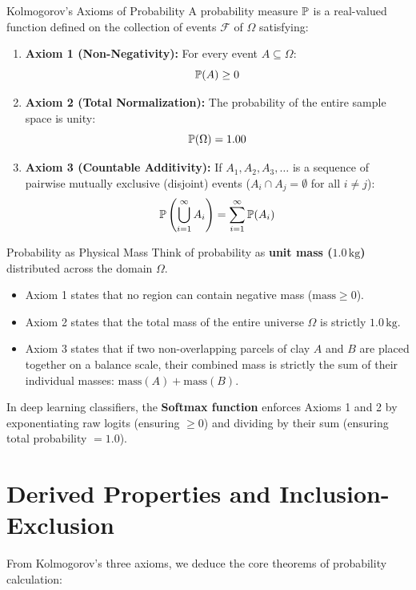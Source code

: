\begin{formulabox}{Kolmogorov's Axioms of Probability}
A probability measure $\P$ is a real-valued function defined on the collection of events $\mathcal{F}$ of $\Omega$ satisfying:
\begin{enumerate}
    \item \textbf{Axiom 1 (Non-Negativity):} For every event $A \subseteq \Omega$:
    $$\P(A) \ge 0$$
    \item \textbf{Axiom 2 (Total Normalization):} The probability of the entire sample space is unity:
    $$\P(\Omega) = 1.00$$
    \item \textbf{Axiom 3 (Countable Additivity):} If $A_1, A_2, A_3, \dots$ is a sequence of pairwise mutually exclusive (disjoint) events ($A_i \cap A_j = \emptyset$ for all $i \neq j$):
    $$\P\left(\bigcup_{i=1}^\infty A_i\right) = \sum_{i=1}^\infty \P(A_i)$$
\end{enumerate}
\end{formulabox}

\begin{intuitionbox}{Probability as Physical Mass}
Think of probability as \textbf{unit mass ($1.0\,\text{kg}$)} distributed across the domain $\Omega$.
\begin{itemize}
    \item Axiom 1 states that no region can contain negative mass ($\text{mass} \ge 0$).
    \item Axiom 2 states that the total mass of the entire universe $\Omega$ is strictly $1.0\,\text{kg}$.
    \item Axiom 3 states that if two non-overlapping parcels of clay $A$ and $B$ are placed together on a balance scale, their combined mass is strictly the sum of their individual masses: $\text{mass}(A) + \text{mass}(B)$.
\end{itemize}
In deep learning classifiers, the \textbf{Softmax function} enforces Axioms 1 and 2 by exponentiating raw logits (ensuring $\ge 0$) and dividing by their sum (ensuring total probability $= 1.0$).
\end{intuitionbox}

\section{Derived Properties and Inclusion-Exclusion}

From Kolmogorov's three axioms, we deduce the core theorems of probability calculation:

